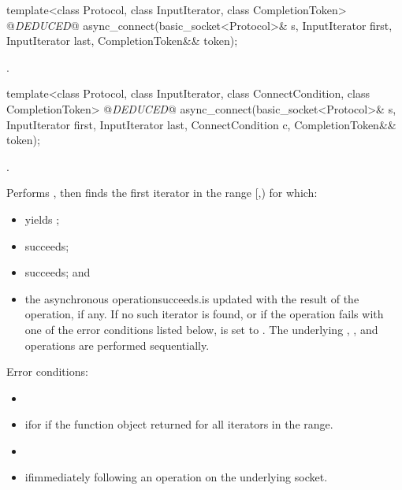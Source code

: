 \begin{itemdecl}
template<class Protocol, class InputIterator, class CompletionToken>
  @\textit{DEDUCED}@ async_connect(basic_socket<Protocol>& s,
                        InputIterator first, InputIterator last,
                        CompletionToken&& token);
\end{itemdecl}

\begin{itemdescr}
\pnum
\returns {}.
\end{itemdescr}

\begin{itemdecl}
template<class Protocol, class InputIterator,
  class ConnectCondition, class CompletionToken>
    @\textit{DEDUCED}@ async_connect(basic_socket<Protocol>& s,
                          InputIterator first, InputIterator last,
                          ConnectCondition c,
                          CompletionToken&& token);
\end{itemdecl}

\begin{itemdescr}
\pnum
\completionsig {}.

\pnum
\effects Performs , then finds the first iterator  in the range [,) for which:
\begin{itemize}
\item
{}yields ;
\item
{}succeeds;
\item
{}succeeds; and
\item
 the asynchronous operationsucceeds.is updated with the result of the operation, if any. If no such iterator is found, or if the operation fails with one of the error conditions listed below, is set to . \enternote The underlying , , and  operations are performed sequentially. \exitnote
\end{itemize}

\pnum
Error conditions: 
\begin{itemize}
\item
{}
\item
 ifor if the function object returned for all iterators in the range.
\item
{}
\item
 ifimmediately following an  operation on the underlying socket.
\end{itemize}
\end{itemdescr}



